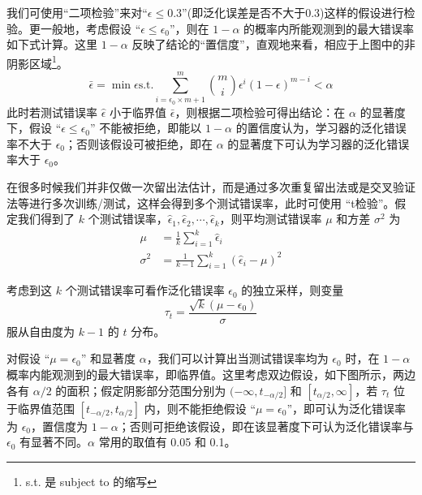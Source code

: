 我们可使用``二项检验''来对``$\epsilon \leq 0.3$''(即泛化误差是否不大于0.3)这样的假设进行检验。更一般地，考虑假设 ``$\epsilon \leq \epsilon_{0}$''，则在 $1-\alpha$ 的概率内所能观测到的最大错误率如下式计算。这里 $1-\alpha$ 反映了结论的``置信度''，直观地来看，相应于上图中的非阴影区域\footnote{s.t. 是 subject to 的缩写}。
\begin{equation}
    \bar{\epsilon} = \min \epsilon \text{s.t.} \sum_{i=\epsilon_0 \times m +1}^{m} \binom{m}{i} \epsilon ^i (1-\epsilon)^{m-i} < \alpha  
\end{equation}
此时若测试错误率 $\hat{\epsilon}$ 小于临界值 $\bar{\epsilon}$，则根据二项检验可得出结论：在 $\alpha$ 的显著度下，假设 ``$\epsilon \leq \epsilon_0$'' 不能被拒绝，即能以 $1-\alpha$ 的置信度认为，学习器的泛化错误率不大于 $\epsilon_0$；否则该假设可被拒绝，即在 $\alpha$ 的显著度下可认为学习器的泛化错误率大于 $\epsilon_0$。

在很多时候我们并非仅做一次留出法估计，而是通过多次重复留出法或是交叉验证法等进行多次训练/测试，这样会得到多个测试错误率，此时可使用 ``t检验''。假定我们得到了 $k$ 个测试错误率，$\hat{\epsilon}_1,\hat{\epsilon}_2,\cdots,\hat{\epsilon}_k$，则平均测试错误率 $\mu$ 和方差 $\sigma^2$ 为
\begin{align}
    \mu &= \frac{1}{k} \sum_{i=1}^{k}\hat{\epsilon}_i \\
    \sigma^2 &= \frac{1}{k-1} \sum^{k}_{i=1} (\hat{\epsilon}_i - \mu)^2
\end{align}

考虑到这 $k$ 个测试错误率可看作泛化错误率 $\epsilon_0$ 的独立采样，则变量
\begin{equation}
    \tau _t = \frac{\sqrt{k}(\mu - \epsilon_0)}{\sigma}
\end{equation}
服从自由度为 $k-1$ 的 $t$ 分布。



对假设 ``$\mu = \epsilon_0$'' 和显著度 $\alpha$，我们可以计算出当测试错误率均为 $\epsilon_0$ 时，在 $1-\alpha$ 概率内能观测到的最大错误率，即临界值。这里考虑双边假设，如下图所示，两边各有 $\alpha /2$ 的面积；假定阴影部分范围分别为 $(-\infty,t_{-\alpha/2}]$ 和 $[t_{\alpha/2},\infty]$，若 $\tau_t$ 位于临界值范围 $[t_{-\alpha/2},t_{\alpha/2}]$ 内，则不能拒绝假设 ``$\mu = \epsilon_0$''，即可认为泛化错误率为 $\epsilon_0$，置信度为 $1-\alpha$；否则可拒绝该假设，即在该显著度下可认为泛化错误率与 $\epsilon_0$ 有显著不同。$\alpha$ 常用的取值有 0.05 和 0.1。

